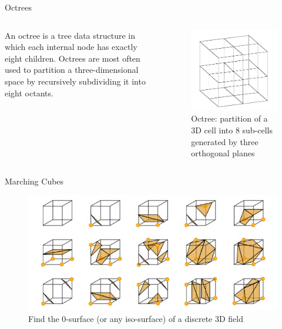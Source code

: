 \begin{frame}{Octrees}
    \begin{columns}
        An octree is a tree data structure in
which each internal node has exactly
eight children. Octrees are most often
used to partition a three-dimensional
space by recursively subdividing it
into eight octants.
        \begin{figure}
            \centering
            \includegraphics[width=\textwidth]{figs/L17-octree.png}
            \caption{Octree: partition of a 3D cell
into 8 sub-cells generated by three
orthogonal planes}
        \end{figure}
    \end{columns}
\end{frame}


\begin{frame}{Marching Cubes}
\begin{figure}
    \centering
            \includegraphics[width=\textwidth]{figs/L16-marching-cubes.jpg}
    \caption{Find the 0-surface (or any iso-surface) of a discrete 3D field \cite{Lorensen1987}}
    \label{fig:my_label}
\end{figure}
    
\end{frame}


